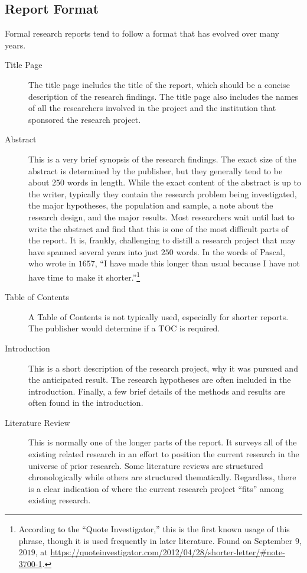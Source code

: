 \subsection{Report Format}

Formal research reports tend to follow a format that has evolved over many years.

\begin{description}
	\item[Title Page] The title page includes the title of the report, which should be a concise description of the research findings. The title page also includes the names of all the researchers involved in the project and the institution that sponsored the research project.

	\item[Abstract] This is a very brief synopsis of the research findings. The exact size of the abstract is determined by the publisher, but they generally tend to be about $ 250 $ words in length. While the exact content of the abstract is up to the writer, typically they contain the research problem being investigated, the major hypotheses, the population and sample, a note about the research design, and the major results. Most researchers wait until last to write the abstract and find that this is one of the most difficult parts of the report. It is, frankly, challenging to distill a research project that may have spanned several years into just $ 250 $ words. In the words of Pascal, who wrote in $ 1657 $, ``I have made this longer than usual because I have not have time to make it shorter.''\footnote{According to the ``Quote Investigator,'' this is the first known usage of this phrase, though it is used frequently in later literature. Found on September $ 9 $, $ 2019 $, at \url{https://quoteinvestigator.com/2012/04/28/shorter-letter/\#note-3700-1}.}
		
	\item[Table of Contents] A Table of Contents is not typically used, especially for shorter reports. The publisher would determine if a TOC is required.

	\item[Introduction]	This is a short description of the research project, why it was pursued and the anticipated result. The research hypotheses are often included in the introduction. Finally, a few brief details of the methods and results are often found in the introduction.

	\item[Literature Review] This is normally one of the longer parts of the report. It surveys all of the existing related research in an effort to position the current research in the universe of prior research. Some literature reviews are structured chronologically while others are structured thematically. Regardless, there is a clear indication of where the current research project ``fits'' among existing research.


\end{description}
